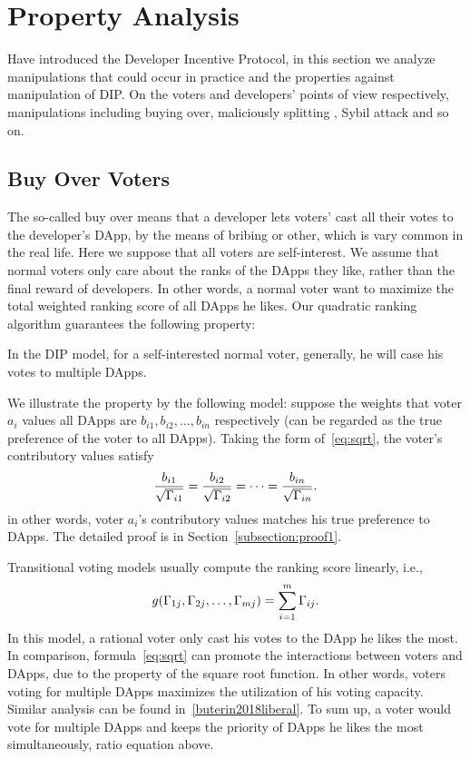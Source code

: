 \section{Property Analysis}
\label{section:properties}
Have introduced the Developer Incentive Protocol, in this section we analyze
manipulations that could occur in practice and the properties against
manipulation of  DIP\@. On the voters and developers' points of view respectively, manipulations including buying over, maliciously splitting \dapp, Sybil attack and so on.
\subsection{Buy Over Voters}
The so-called buy over means that a developer lets voters' cast all their votes to the developer's DApp, by the means of bribing or other, which is vary common in the real life. Here we suppose that all voters are self-interest. We assume that normal voters only care about the ranks of the DApps they like, rather than the final reward of developers. In other words, a normal voter want to maximize the total
weighted ranking score of all DApps he likes. Our quadratic ranking algorithm guarantees the following property:
\begin{property}
	\label{p1}
	In the DIP model, for a self-interested normal voter, generally, he will case his votes to multiple DApps.
\end{property}
We illustrate the property by the following model: suppose the weights that
voter $a_i$ values all DApps are $b_{i1}, b_{i2}, \ldots, b_{in}$ respectively (can be regarded as the true preference of the voter to all DApps). Taking the form of~\ref{eq:sqrt}, the voter's contributory values satisfy
$$\frac{b_{i1}}{\sqrt{\Gamma_{i1}}}=\frac{b_{i2}}{\sqrt{\Gamma_{i2}}}=\cdots=\frac{b_{in}}{\sqrt{\Gamma_{in}}}.$$
in other words, voter $a_i$'s contributory values matches his true preference to DApps. The detailed proof is in Section~\ref{subsection:proof1}.

Transitional voting models usually compute the ranking score linearly, i.e.,
$$g(\Gamma_{1j},\Gamma_{2j},\ldots,\Gamma_{mj}) = \sum_{i=1}^m \Gamma_{ij}.$$
In this model, a rational voter only cast his votes to the DApp he likes the
most. In comparison, formula~\ref{eq:sqrt} can promote the interactions between
voters and DApps, due to the property of the square root function. In other
words, voters voting for multiple DApps maximizes the utilization of his voting
capacity. Similar analysis can be found in~\ref{buterin2018liberal}. To sum up,
a voter would vote for multiple DApps and keeps the priority of DApps he likes
the most simultaneously, \ie ratio equation above.

